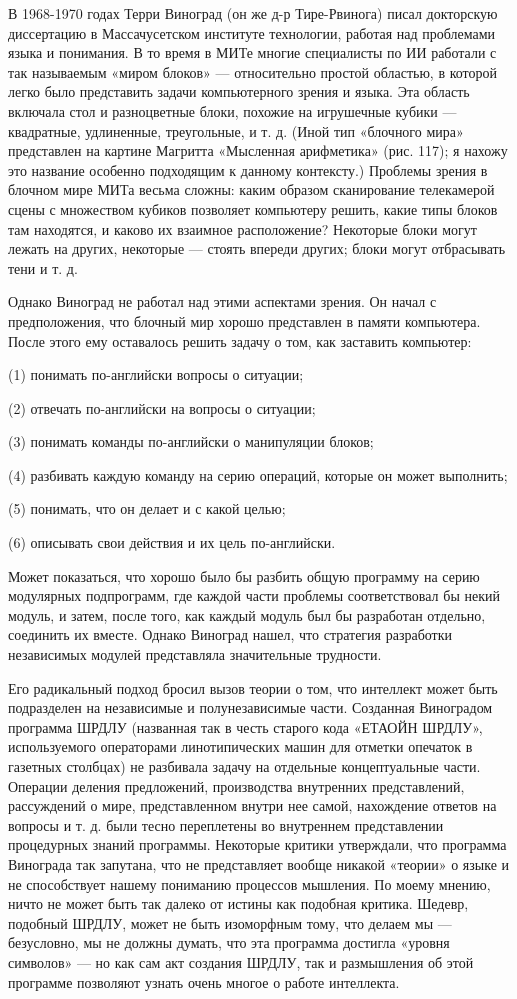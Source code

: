 В 1968-1970 годах Терри Виноград (он же д-р Тире-Рвинога) писал докторскую диссертацию в Массачусетском институте технологии, работая над проблемами языка и понимания. В то время в МИТе многие специалисты по ИИ работали с так называемым «миром блоков» --- относительно простой областью, в которой легко было представить задачи компьютерного зрения и языка. Эта область включала стол и разноцветные блоки, похожие на игрушечные кубики --- квадратные, удлиненные, треугольные, и т. д. (Иной тип «блочного мира» представлен на картине Магритта «Мысленная арифметика» (рис. 117); я нахожу это название особенно подходящим к данному контексту.) Проблемы зрения в блочном мире МИТа весьма сложны: каким образом сканирование телекамерой сцены с множеством кубиков позволяет компьютеру решить, какие типы блоков там находятся, и каково их взаимное расположение? Некоторые блоки могут лежать на других, некоторые --- стоять впереди других; блоки могут отбрасывать тени и т. д.

Однако Виноград не работал над этими аспектами зрения. Он начал с предположения, что блочный мир хорошо представлен в памяти компьютера. После этого ему оставалось решить задачу о том, как заставить компьютер:

(1) понимать по-английски вопросы о ситуации;

(2) отвечать по-английски на вопросы о ситуации;

(3) понимать команды по-английски о манипуляции блоков;

(4) разбивать каждую команду на серию операций, которые он может выполнить;

(5) понимать, что он делает и с какой целью;

(6) описывать свои действия и их цель по-английски.

Может показаться, что хорошо было бы разбить общую программу на серию модулярных подпрограмм, где каждой части проблемы соответствовал бы некий модуль, и затем, после того, как каждый модуль был бы разработан отдельно, соединить их вместе. Однако Виноград нашел, что стратегия разработки независимых модулей представляла значительные трудности.

Его радикальный подход бросил вызов теории о том, что интеллект может быть подразделен на независимые и полунезависимые части. Созданная Виноградом программа ШРДЛУ (названная так в честь старого кода «ЕТАОЙН ШРДЛУ», используемого операторами линотипических машин для отметки опечаток в газетных столбцах) не разбивала задачу на отдельные концептуальные части. Операции деления предложений, производства внутренних представлений, рассуждений о мире, представленном внутри нее самой, нахождение ответов на вопросы и т. д. были тесно переплетены во внутреннем представлении процедурных знаний программы. Некоторые критики утверждали, что программа Винограда так запутана, что не представляет вообще никакой «теории» о языке и не способствует нашему пониманию процессов мышления. По моему мнению, ничто не может быть так далеко от истины как подобная критика. Шедевр, подобный ШРДЛУ, может не быть изоморфным тому, что делаем мы --- безусловно, мы не должны думать, что эта программа достигла «уровня символов» --- но как сам акт создания ШРДЛУ, так и размышления об этой программе позволяют узнать очень многое о работе интеллекта.

